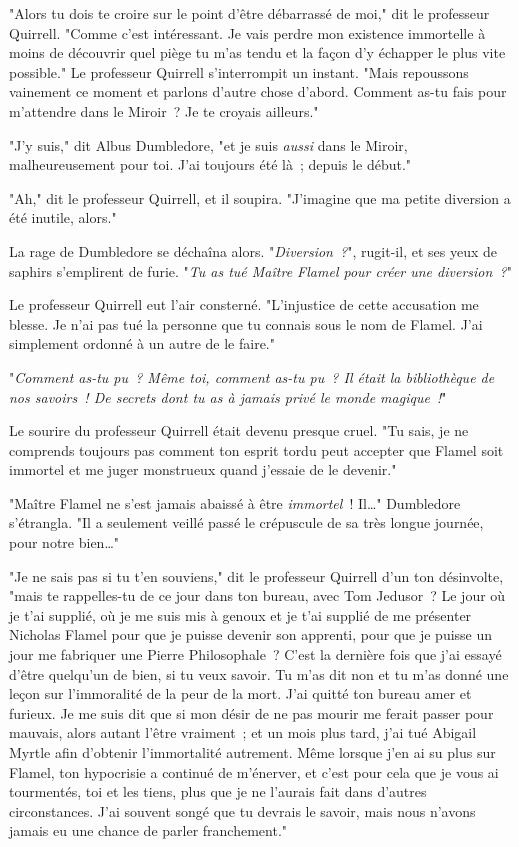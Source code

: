 "Alors tu dois te croire sur le point d'être débarrassé de moi," dit le professeur Quirrell. "Comme c'est intéressant. Je vais perdre mon existence immortelle à moins de découvrir quel piège tu m'as tendu et la façon d'y échapper le plus vite possible." Le professeur Quirrell s'interrompit un instant. "Mais repoussons vainement ce moment et parlons d'autre chose d'abord. Comment as-tu fais pour m'attendre dans le Miroir~? Je te croyais ailleurs."

"J'y suis," dit Albus Dumbledore, "et je suis \emph{aussi} dans le Miroir, malheureusement pour toi. J'ai toujours été là~; depuis le début."

"Ah," dit le professeur Quirrell, et il soupira. "J'imagine que ma petite diversion a été inutile, alors."

La rage de Dumbledore se déchaîna alors. "\emph{Diversion~?}", rugit-il, et ses yeux de saphirs s'emplirent de furie. "\emph{Tu as tué Maître Flamel pour créer une diversion~?}"

Le professeur Quirrell eut l'air consterné. "L'injustice de cette accusation me blesse. Je n'ai pas tué la personne que tu connais sous le nom de Flamel. J'ai simplement ordonné à un autre de le faire."

"\emph{Comment as-tu pu~? Même toi, comment as-tu pu~? Il était la bibliothèque de nos savoirs~! De secrets dont tu as à jamais privé le monde magique~!}"

Le sourire du professeur Quirrell était devenu presque cruel. "Tu sais, je ne comprends toujours pas comment ton esprit tordu peut accepter que Flamel soit immortel et me juger monstrueux quand j'essaie de le devenir."

"Maître Flamel ne s'est jamais abaissé à être \emph{immortel}~! Il…" Dumbledore s'étrangla. "Il a seulement veillé passé le crépuscule de sa très longue journée, pour notre bien…"

"Je ne sais pas si tu t'en souviens," dit le professeur Quirrell d'un ton désinvolte, "mais te rappelles-tu de ce jour dans ton bureau, avec Tom Jedusor~? Le jour où je t'ai supplié, où je me suis mis à genoux et je t'ai supplié de me présenter Nicholas Flamel pour que je puisse devenir son apprenti, pour que je puisse un jour me fabriquer une Pierre Philosophale~? C'est la dernière fois que j'ai essayé d'être quelqu'un de bien, si tu veux savoir. Tu m'as dit non et tu m'as donné une leçon sur l'immoralité de la peur de la mort. J'ai quitté ton bureau amer et furieux. Je me suis dit que si mon désir de ne pas mourir me ferait passer pour mauvais, alors autant l'être vraiment~; et un mois plus tard, j'ai tué Abigail Myrtle afin d'obtenir l'immortalité autrement. Même lorsque j'en ai su plus sur Flamel, ton hypocrisie a continué de m'énerver, et c'est pour cela que je vous ai tourmentés, toi et les tiens, plus que je ne l'aurais fait dans d'autres circonstances. J'ai souvent songé que tu devrais le savoir, mais nous n'avons jamais eu une chance de parler franchement."

